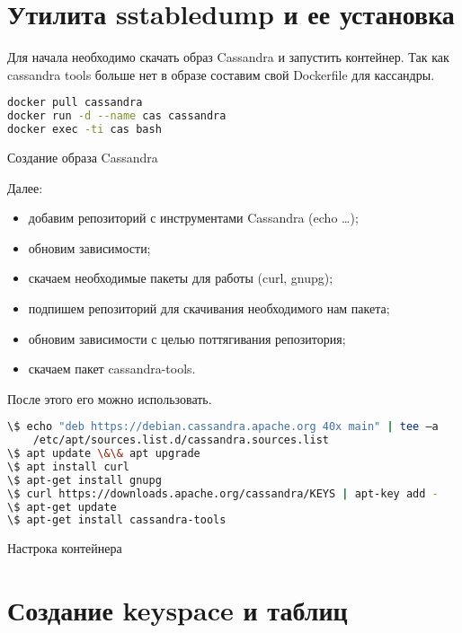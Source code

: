 \section{Утилита sstabledump и ее установка}

Для начала необходимо скачать образ Cassandra и запустить контейнер.
Так как cassandra tools больше нет в образе составим свой Dockerfile для кассандры.

\begin{lstlisting}[language=bash]
docker pull cassandra
docker run -d --name cas cassandra
docker exec -ti cas bash
\end{lstlisting}

\begin{image}
	\caption{Создание образа Cassandra}
	\label{fig:docker:cas}
\end{image}

Далее:
\begin{itemize}
	\item добавим репозиторий с инструментами Cassandra (echo …);
	\item обновим зависимости;
	\item скачаем необходимые пакеты для работы (curl, gnupg);
	\item подпишем репозиторий для скачивания необходимого нам пакета;
	\item обновим зависимости с целью поттягивания репозитория;
	\item скачаем пакет cassandra-tools.
\end{itemize}

После этого его можно использовать.

\begin{lstlisting}[language=bash]
\$ echo "deb https://debian.cassandra.apache.org 40x main" | tee –a
	/etc/apt/sources.list.d/cassandra.sources.list
\$ apt update \&\& apt upgrade
\$ apt install curl
\$ apt-get install gnupg
\$ curl https://downloads.apache.org/cassandra/KEYS | apt-key add -
\$ apt-get update
\$ apt-get install cassandra-tools
\end{lstlisting}

\begin{image}
	\caption{Настрока контейнера}
	\label{fig:docker:bash}
\end{image}

\section{Создание keyspace и таблиц}

